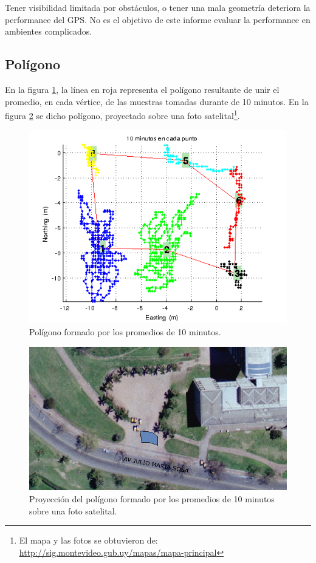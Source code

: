 \documentclass[spanish,12pt,a4paper,titlepage]{report}
\begin{document}
Tener visibilidad limitada por obstáculos, o tener una mala geometría deteriora la performance del GPS. No es el objetivo de este informe evaluar la performance en ambientes complicados.


\newpage
\subsection{Polígono}
\label{sec:gps2-poligono}

En la figura \ref{fig:10min_pol.png}, la línea en roja representa el polígono resultante de unir el promedio, en cada vértice, de las muestras tomadas durante de 10 minutos. En la figura \ref{fig:10m_mapa.png} se dicho polígono, proyectado sobre una foto satelital\footnote{El mapa y las fotos se obtuvieron de:\\ \url{http://sig.montevideo.gub.uy/mapas/mapa-principal}}.

\begin{figure}[h!]
  \centering
  \includegraphics[width=.8\textwidth]{./img/10min_pol.png}
  \caption{Polígono formado por los promedios de 10 minutos.}
  \label{fig:10min_pol.png}
\end{figure}

\begin{figure}[h!]
  \centering
  \includegraphics[width=.8\textwidth]{./img/10m_mapa.png}
  \caption{Proyección del polígono formado por los promedios de 10 minutos sobre una foto satelital.}
  \label{fig:10m_mapa.png}
\end{figure}
\end{document}
